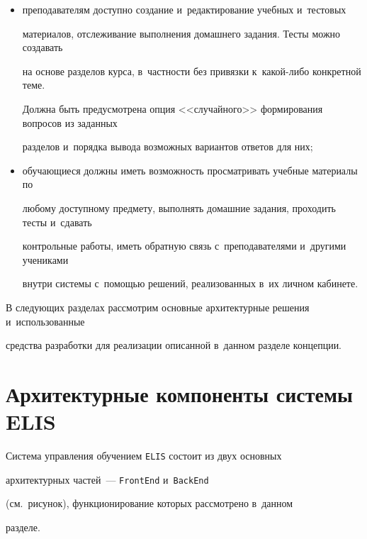 \begin{itemize}
\item преподавателям доступно создание и~редактирование учебных и~тестовых 


материалов, отслеживание выполнения домашнего задания. Тесты можно создавать 


на основе разделов курса, в~частности без привязки к~ка\-ко\-й-ли\-бо конкретной теме.


 Должна быть предусмотрена опция <<случайного>> формирования вопросов из заданных 


 разделов и~порядка вывода возможных вариантов ответов для них;


\item обучающиеся должны иметь возможность просматривать учебные материалы по 


любому доступному предмету, выполнять домашние задания, проходить тесты и~сдавать 


контрольные работы, иметь обратную связь с~преподавателями и~другими учениками 


внутри системы с~помощью решений, реализованных в~их личном кабинете.


\end{itemize}





В следующих разделах рассмотрим основные архитектурные решения и~использованные 


средства разработки для реализации описанной в~данном разделе концепции.





\section{Архитектурные компоненты системы ELIS}





\vspace*{-3pt}





Система  управления обучением \verb"ELIS" состоит из двух основных


 архитектурных частей~--- \verb"FrontEnd" и~\verb"BackEnd" 


 (см.\ рисунок), функционирование которых рас\-смот\-ре\-но в~данном 


 разделе.





